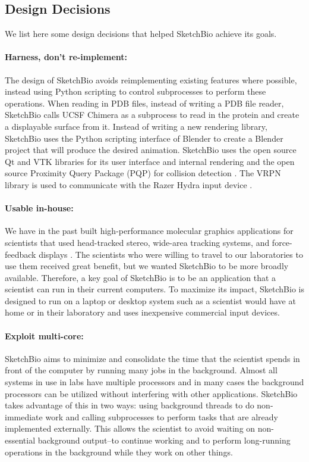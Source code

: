 \documentclass[twocolumn]{bmcart}%
\begin{document}
\subsection*{Design Decisions}
We list here some design decisions that helped SketchBio achieve its goals.

\paragraph*{Harness, don't re-implement:} The design of SketchBio avoids reimplementing existing features where possible, instead using Python scripting to control subprocesses to perform these operations.
When reading in PDB files, instead of writing a PDB file reader, SketchBio calls UCSF Chimera as a subprocess to read in the protein and create a displayable surface from it.
Instead of writing a new rendering library, SketchBio uses the Python scripting interface of Blender to create a Blender project that will produce the desired animation.
SketchBio uses the open source Qt and VTK\cite{VTKbook} libraries for its user interface and internal rendering and the open source Proximity Query Package (PQP) for collision detection \cite{PQP}.
The VRPN library is used to communicate with the Razer Hydra input device \cite{taylor2001vrpn}.

\paragraph*{Usable in-house:} We have in the past built high-performance molecular graphics applications for scientists that used head-tracked stereo, wide-area tracking systems, and force-feedback displays \cite{Arthur,Grant1998,Marshburn2005,Taylor1999,Taylor1997,Taylor1993}.
The scientists who were willing to travel to our laboratories to use them received great benefit, but we wanted SketchBio to be more broadly available.
Therefore, a key goal of SketchBio is to be an application that a scientist can run in their current computers.
To maximize its impact, SketchBio is designed to run on a laptop or desktop system such as a scientist would have at home or in their laboratory and uses inexpensive commercial input devices.

\paragraph*{Exploit multi-core:} SketchBio aims to minimize and consolidate the time that the scientist spends in front of the computer by running many jobs in the background.
Almost all systems in use in labs have multiple processors and in many cases the background processors can be utilized without interfering with other applications.
SketchBio takes advantage of this in two ways: using background threads to do non-immediate work and calling subprocesses to perform tasks that are already implemented externally.
This allows the scientist to avoid waiting on non-essential background output--to continue working and to perform long-running operations in the background while they work on other things.
\end{document}

